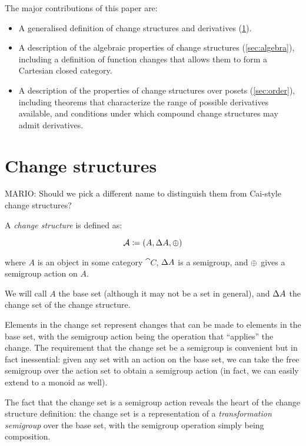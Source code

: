 The major contributions of this paper are:
\begin{itemize}
  \item A generalised definition of change structures and derivatives
    (\ref{sec:change-structures}).
  \item A description of the algebraic properties of change structures (\ref{sec:algebra}), including
    a definition of function changes that allows them to form a Cartesian closed
    category.
  \item A description of the properties of change structures over posets
    (\ref{sec:order}), including theorems that characterize the range of
    possible derivatives available, and conditions under which compound change
    structures may admit derivatives.
\end{itemize}

\section{Change structures}
\label{sec:change-structures}

MARIO: Should we pick a different name to distinguish them from Cai-style change structures?
\begin{defn}

  A \textit{change structure} is defined as:

  $$\mathcal{A} \coloneqq (A,\Delta A,\oplus)$$

  where $A$ is an object in some category $\cat{C}$, $\Delta A$ is a semigroup, and $\oplus$ gives a semigroup action on $A$.

  We will call $A$ the base set (although it may not be a set in general), and $\Delta A$ the change set of the change structure.
\end{defn}

Elements in the change set represent changes that can be made to elements in the
base set, with the semigroup action being the operation that ``applies'' the
change. The requirement that the change set be a semigroup is convenient but in
fact inessential: given any set with an action on the base set, we can take the
free semigroup over the action set to obtain a semigroup action (in fact, we can
easily extend to a monoid as well).

The fact that the change set is a semigroup action reveals the heart of the
change structure definition: the change set is a representation of a
\textit{transformation semigroup} over the base set, with the semigroup
operation simply being composition.


